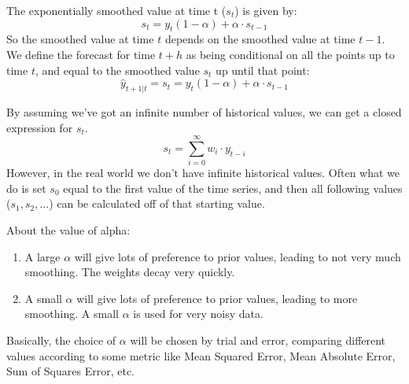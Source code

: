     The exponentially smoothed value at time t ($s_t$) is given by:
    \[
        s_t = y_t(1 - \alpha) + \alpha \cdot s_{t-1}
    \]
    So the smoothed value at time $t$ depends on the smoothed value at time
    $t-1$. 
    We define the forecast for time $t+h$ as being conditional on all the
    points up to time $t$, and equal to the smoothed value $s_t$ up until that
    point:
    \begin{equation*}
        \hat{y}_{t + 1 | t} = s_t = y_t(1 - \alpha) + \alpha \cdot s_{t-1}
    \end{equation*}

    By assuming we've got an infinite number of historical values, we
    can get a closed expression for $s_t$.
    \[
    s_t = \sum_{i=0}^\infty w_i \cdot y_{t-i}
\]
    However, in the real world we don't have infinite historical values. Often
    what we do is set $s_0$ equal to the first value of the time series, and
    then all following values ($s_1, s_2, \dots$) can be calculated off of that
    starting value.

    About the value of alpha:
    \begin{enumerate}
        \item A large $\alpha$ will give lots of preference to prior values,
            leading to not very much smoothing. The weights decay very quickly.
        \item A small $\alpha$ will give lots of preference to prior values,
            leading to more smoothing. A small $\alpha$ is used for very noisy
            data.
    \end{enumerate}
    
    Basically, the choice of $\alpha$ will be chosen by trial and error,
    comparing different values according to some metric like Mean Squared
    Error, Mean Absolute Error, Sum of Squares Error, etc.


